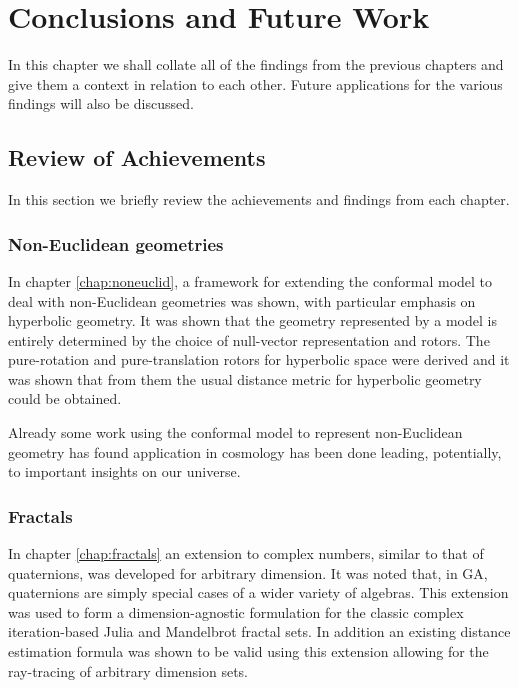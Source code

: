 \chapter{Conclusions and Future Work}

In this chapter we shall collate all of the findings from the previous chapters
and give them a context in relation to each other. Future applications for
the various findings will also be discussed.

\section{Review of Achievements}

In this section we briefly review the achievements and findings from each
chapter.

\subsection{Non-Euclidean geometries}

In chapter \ref{chap:noneuclid}, a framework for extending the conformal
model to deal with non-Euclidean geometries was shown, with particular
emphasis on hyperbolic geometry. It was shown that the geometry
represented by a model is entirely determined by the choice of null-vector
representation and rotors. The pure-rotation and pure-translation 
rotors for hyperbolic space were derived and it was shown that from them the usual
distance metric for hyperbolic geometry could be obtained.

Already some work using the conformal model to represent non-Euclidean geometry
has found application in cosmology\cite{GA:SIGKEY} has been done leading, potentially, to important insights on
our universe.

\subsection{Fractals}

In chapter \ref{chap:fractals} an extension to complex numbers, similar to that
of quaternions, was developed for arbitrary dimension. It was noted that, in
GA, quaternions are simply special cases of a wider variety of algebras. This
extension was used to form a dimension-agnostic formulation for the classic
complex iteration-based Julia and Mandelbrot fractal sets. In addition an
existing distance estimation formula was shown to be valid using this extension
allowing for the ray-tracing of arbitrary dimension sets.

